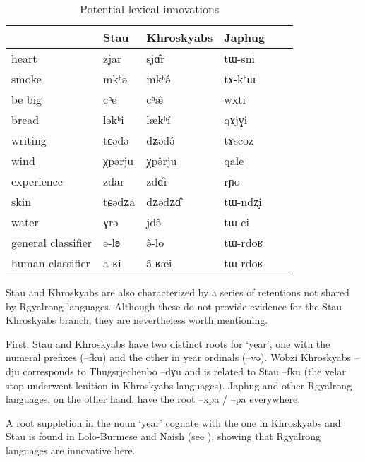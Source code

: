\documentclass[oneside,a4paper,11pt]{article}
\newcommand{\ipa}[1]{{\phon #1}} %
\begin{document}
  \begin{table}[h]
  \caption{Potential lexical innovations} \label{tab:lexicon} \centering
 \begin{tabular}{llllll}
 \toprule
 &	Stau &	Khroskyabs &	Japhug &	\\	
  \midrule
heart &	\ipa{zjar}  &	\ipa{sjɑ̂r} &	\ipa{tɯ-sni} &	\\	
smoke  &	\ipa{mkʰə} &	\ipa{mkʰə́} &	\ipa{tɤ-kʰɯ} &	\\	
be big  &	\ipa{cʰe} &	\ipa{cʰæ̂} &	\ipa{wxti} &	\\	
bread  &	\ipa{ləkʰi} &	\ipa{lækʰí} &	\ipa{qɤjɣi} &	\\	
writing  &	\ipa{tɕədə} &	\ipa{dʑədə́} &	\ipa{tɤscoz} &	\\	
wind  &	\ipa{χpərju} &	\ipa{χpə̂rju    } &	\ipa{qale} &	\\	
experience  &	\ipa{zdar} &	\ipa{zdɑ̂r} &	\ipa{rɲo} &	\\	
skin  &	\ipa{tɕədʑa} &	\ipa{dʑədʑɑ̂} &	\ipa{tɯ-ndʐi} &	\\	
water  &	\ipa{ɣrə} &	\ipa{jdə̂} &	\ipa{tɯ-ci} &	\\
general classifier  &	\ipa{ə-lʚ} &	\ipa{ə̂-lo} &	\ipa{tɯ-rdoʁ} &	\\	
human classifier  &	\ipa{a-ʁi} &	\ipa{ə̂-ʁæi} &	\ipa{tɯ-rdoʁ} &	\\	
\bottomrule
\end{tabular}
\end{table}

Stau and Khroskyabs are also characterized by a series of retentions not shared by Rgyalrong languages. Although these do not provide evidence for the Stau-Khroskyabs branch, they are nevertheless worth mentioning.

First, Stau and Khroskyabs have two distinct roots for `year', one with the numeral prefixes (\ipa{--fku}) and the other in year ordinals (\ipa{--və}). Wobzi Khroskyabs \ipa{--dju} corresponds to Thugsrjechenbo \ipa{--dɣu} and is related to Stau \ipa{--fku} (the velar stop underwent lenition in Khroskyabs languages). Japhug and other Rgyalrong languages, on the other hand, have the root \ipa{--xpa} / \ipa{--pa} everywhere. 

A root suppletion in the noun `year' cognate with the one in Khroskyabs and Stau is found in Lolo-Burmese and Naish (see \citealt{jacques.michaud11naish}), showing that Rgyalrong languages are innovative here.
\end{document}
